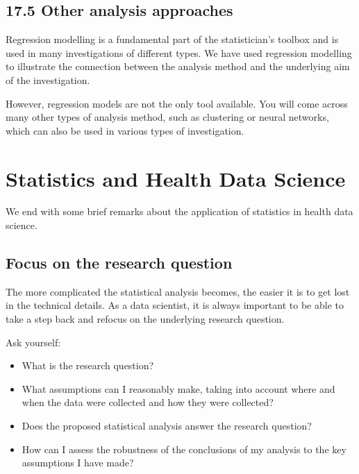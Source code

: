 \documentclass[letterpaper,10pt,english]{jupyterBook}
\begin{document}
\section{17.5 Other analysis approaches}
\label{\detokenize{17. Investigations round up:other-analysis-approaches}}
\sphinxAtStartPar
Regression modelling is a fundamental part of the statistician’s toolbox and is used in many investigations of different types.  We have used regression modelling to illustrate the connection between the analysis method and the underlying aim of the investigation.

\sphinxAtStartPar
However, regression models are not the only tool available. You will come across many other types of analysis method, such as clustering or neural networks, which can also be used in various types of investigation.


\chapter{Statistics and Health Data Science}
\label{\detokenize{18. Statistics for HDS round up:statistics-and-health-data-science}}\label{\detokenize{18. Statistics for HDS round up::doc}}
\sphinxAtStartPar
We end with some brief remarks about the application of statistics in health data science.


\section{Focus on the research question}
\label{\detokenize{18. Statistics for HDS round up:focus-on-the-research-question}}
\sphinxAtStartPar
The more complicated the statistical analysis becomes, the easier it is to get lost in the technical details. As a data scientist, it is always important to be able to take a step back and re\sphinxhyphen{}focus on the underlying research question.

\sphinxAtStartPar
Ask yourself:
\begin{itemize}
\item {} 
\sphinxAtStartPar
What is the research question?

\item {} 
\sphinxAtStartPar
What assumptions can I reasonably make, taking into account where and when the data were collected and how they were collected?

\item {} 
\sphinxAtStartPar
Does the proposed statistical analysis answer the research question?

\item {} 
\sphinxAtStartPar
How can I assess the robustness of the conclusions of my analysis to the key assumptions I have made?

\end{itemize}
\end{document}
